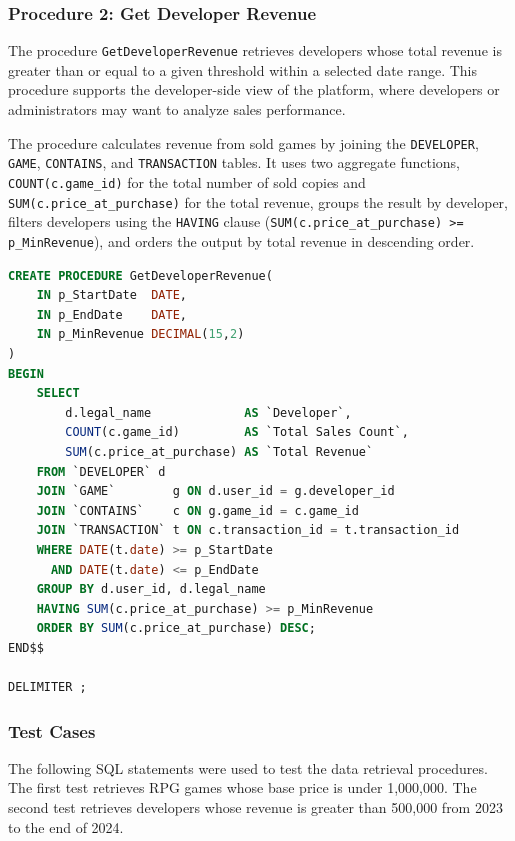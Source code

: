 \subsubsection{Procedure 2: Get Developer Revenue}

The procedure \texttt{GetDeveloperRevenue} retrieves developers whose total revenue is greater than or equal to a given threshold within a selected date range.
This procedure supports the developer-side view of the platform, where developers or administrators may want to analyze sales performance.

The procedure calculates revenue from sold games by joining the \texttt{DEVELOPER}, \texttt{GAME}, \texttt{CONTAINS}, and \texttt{TRANSACTION} tables.
It uses two aggregate functions, \texttt{COUNT(c.game\_id)} for the total number of sold copies and \texttt{SUM(c.price\_at\_purchase)} for the total revenue, groups the result by developer, filters developers using the \texttt{HAVING} clause (\texttt{SUM(c.price\_at\_purchase) >= p\_MinRevenue}), and orders the output by total revenue in descending order.

\begin{lstlisting}[language=SQL, caption={Procedure for retrieving developer revenue (column aliases shown in English; the actual SQL file uses Vietnamese aliases such as \texttt{Nhà Phát Triển}, \texttt{Tổng Số Lượt Bán}, \texttt{Tổng Doanh Thu})}, label={lst:get-developer-revenue}]
CREATE PROCEDURE GetDeveloperRevenue(
    IN p_StartDate  DATE,
    IN p_EndDate    DATE,
    IN p_MinRevenue DECIMAL(15,2)
)
BEGIN
    SELECT
        d.legal_name             AS `Developer`,
        COUNT(c.game_id)         AS `Total Sales Count`,
        SUM(c.price_at_purchase) AS `Total Revenue`
    FROM `DEVELOPER` d
    JOIN `GAME`        g ON d.user_id = g.developer_id
    JOIN `CONTAINS`    c ON g.game_id = c.game_id
    JOIN `TRANSACTION` t ON c.transaction_id = t.transaction_id
    WHERE DATE(t.date) >= p_StartDate
      AND DATE(t.date) <= p_EndDate
    GROUP BY d.user_id, d.legal_name
    HAVING SUM(c.price_at_purchase) >= p_MinRevenue
    ORDER BY SUM(c.price_at_purchase) DESC;
END$$

DELIMITER ;
\end{lstlisting}
\subsubsection{Test Cases}

The following SQL statements were used to test the data retrieval procedures. 
The first test retrieves RPG games whose base price is under 1,000,000. 
The second test retrieves developers whose revenue is greater than 500,000 from 2023 to the end of 2024.

